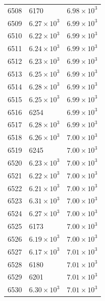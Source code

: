 \begin{table}[H]
\begin{tabular}{lll}
6508 & 6170 & $\displaystyle 6.98 \times 10^{3}$ \\
6509 & $\displaystyle 6.27 \times 10^{3}$ & $\displaystyle 6.99 \times 10^{3}$ \\
6510 & $\displaystyle 6.22 \times 10^{3}$ & $\displaystyle 6.99 \times 10^{3}$ \\
6511 & $\displaystyle 6.24 \times 10^{3}$ & $\displaystyle 6.99 \times 10^{3}$ \\
6512 & $\displaystyle 6.23 \times 10^{3}$ & $\displaystyle 6.99 \times 10^{3}$ \\
6513 & $\displaystyle 6.25 \times 10^{3}$ & $\displaystyle 6.99 \times 10^{3}$ \\
6514 & $\displaystyle 6.28 \times 10^{3}$ & $\displaystyle 6.99 \times 10^{3}$ \\
6515 & $\displaystyle 6.25 \times 10^{3}$ & $\displaystyle 6.99 \times 10^{3}$ \\
6516 & 6254 & $\displaystyle 6.99 \times 10^{3}$ \\
6517 & $\displaystyle 6.28 \times 10^{3}$ & $\displaystyle 6.99 \times 10^{3}$ \\
6518 & $\displaystyle 6.26 \times 10^{3}$ & $\displaystyle 7.00 \times 10^{3}$ \\
6519 & 6245 & $\displaystyle 7.00 \times 10^{3}$ \\
6520 & $\displaystyle 6.23 \times 10^{3}$ & $\displaystyle 7.00 \times 10^{3}$ \\
6521 & $\displaystyle 6.22 \times 10^{3}$ & $\displaystyle 7.00 \times 10^{3}$ \\
6522 & $\displaystyle 6.21 \times 10^{3}$ & $\displaystyle 7.00 \times 10^{3}$ \\
6523 & $\displaystyle 6.31 \times 10^{3}$ & $\displaystyle 7.00 \times 10^{3}$ \\
6524 & $\displaystyle 6.27 \times 10^{3}$ & $\displaystyle 7.00 \times 10^{3}$ \\
6525 & 6173 & $\displaystyle 7.00 \times 10^{3}$ \\
6526 & $\displaystyle 6.19 \times 10^{3}$ & $\displaystyle 7.00 \times 10^{3}$ \\
6527 & $\displaystyle 6.17 \times 10^{3}$ & $\displaystyle 7.01 \times 10^{3}$ \\
6528 & 6180 & $\displaystyle 7.01 \times 10^{3}$ \\
6529 & 6201 & $\displaystyle 7.01 \times 10^{3}$ \\
6530 & $\displaystyle 6.30 \times 10^{3}$ & $\displaystyle 7.01 \times 10^{3}$ \\

\end{tabular}
\end{table}
